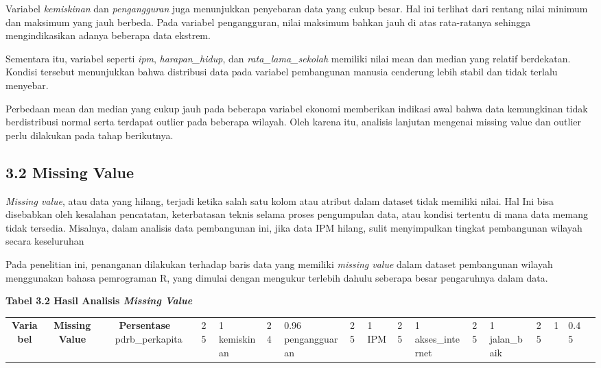 \documentclass[
  12pt,
]{article}
\begin{document}
Variabel \textit{kemiskinan} dan \textit{pengangguran} juga menunjukkan
penyebaran data yang cukup besar. Hal ini terlihat dari rentang nilai
minimum dan maksimum yang jauh berbeda. Pada variabel pengangguran,
nilai maksimum bahkan jauh di atas rata-ratanya sehingga mengindikasikan
adanya beberapa data ekstrem.

Sementara itu, variabel seperti \textit{ipm}, \textit{harapan_hidup},
dan \textit{rata_lama_sekolah} memiliki nilai mean dan median yang
relatif berdekatan. Kondisi tersebut menunjukkan bahwa distribusi data
pada variabel pembangunan manusia cenderung lebih stabil dan tidak
terlalu menyebar.

Perbedaan mean dan median yang cukup jauh pada beberapa variabel ekonomi
memberikan indikasi awal bahwa data kemungkinan tidak berdistribusi
normal serta terdapat outlier pada beberapa wilayah. Oleh karena itu,
analisis lanjutan mengenai missing value dan outlier perlu dilakukan
pada tahap berikutnya.

\subsection{\texorpdfstring{\normalsize 3.2 \hspace {0,5cm} Missing
Value}{3.2  Missing Value}}\label{missing-value}

\vspace{-0.5cm}

\textit{Missing value}, atau data yang hilang, terjadi ketika salah satu
kolom atau atribut dalam dataset tidak memiliki nilai. Hal Ini bisa
disebabkan oleh kesalahan pencatatan, keterbatasan teknis selama proses
pengumpulan data, atau kondisi tertentu di mana data memang tidak
tersedia. Misalnya, dalam analisis data pembangunan ini, jika data IPM
hilang, sulit menyimpulkan tingkat pembangunan wilayah secara
keseluruhan

Pada penelitian ini, penanganan dilakukan terhadap baris data yang
memiliki \textit{missing value} dalam dataset pembangunan wilayah
menggunakan bahasa pemrograman R, yang dimulai dengan mengukur terlebih
dahulu seberapa besar pengaruhnya dalam data.

\vspace{6cm}

\begin{center}
\textbf{Tabel 3.2 Hasil Analisis \textit{Missing Value}}

\begin{tabular}{|c|c|c|}
\hline
\textbf{Variabel} & \textbf{Missing Value} & \textbf{Persentase} \
\hline
pdrb_perkapita & 25 & 1%
\hline
kemiskinan & 24 & 0.96%
\hline
pengangguaran & 25 & 1%
\hline
IPM & 25 & 1%
\hline
akses_internet & 25 & 1%
\hline
jalan_baik & 25 & 1%
\hline
{} & 0.45%
\hline
\end{tabular}

\end{center}
\end{document}
